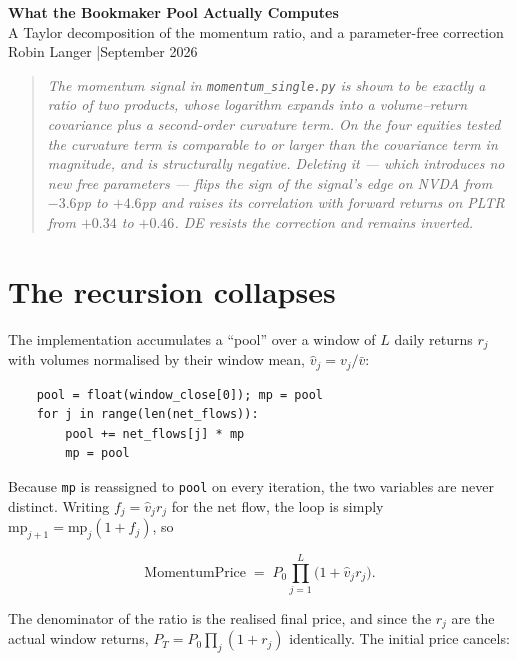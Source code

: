 \documentclass[11pt,a4paper]{article}
\newcommand{\vhat}{\hat{v}}
\begin{document}
\begin{center}
{\LARGE\bfseries\color{accent} What the Bookmaker Pool Actually Computes}\\[0.5em]
{\large A Taylor decomposition of the momentum ratio, and a parameter-free correction}\\[1em]
{\small Robin Langer \quad|\quad September 2026}
\end{center}

\vspace{0.5em}

\begin{quote}
\small\itshape
The momentum signal in \texttt{momentum\_single.py} is shown to be exactly a ratio of two
products, whose logarithm expands into a volume--return covariance plus a second-order
curvature term. On the four equities tested the curvature term is comparable to or larger
than the covariance term in magnitude, and is structurally negative. Deleting it --- which
introduces no new free parameters --- flips the sign of the signal's edge on NVDA from
$-3.6$pp to $+4.6$pp and raises its correlation with forward returns on PLTR from $+0.34$
to $+0.46$. DE resists the correction and remains inverted.
\end{quote}

\section{The recursion collapses}

The implementation accumulates a ``pool'' over a window of $L$ daily returns $r_j$ with
volumes normalised by their window mean, $\vhat_j = v_j / \bar{v}$:

\begin{verbatim}
    pool = float(window_close[0]); mp = pool
    for j in range(len(net_flows)):
        pool += net_flows[j] * mp
        mp = pool
\end{verbatim}

Because \texttt{mp} is reassigned to \texttt{pool} on every iteration, the two variables are
never distinct. Writing $f_j = \vhat_j r_j$ for the net flow, the loop is simply
$\mathrm{mp}_{j+1} = \mathrm{mp}_j (1 + f_j)$, so

\[
\text{MomentumPrice} \;=\; P_0 \prod_{j=1}^{L} \bigl(1 + \vhat_j r_j\bigr).
\]

The denominator of the ratio is the realised final price, and since the $r_j$ are the actual
window returns, $P_T = P_0 \prod_j (1 + r_j)$ identically. The initial price cancels:
\end{document}
